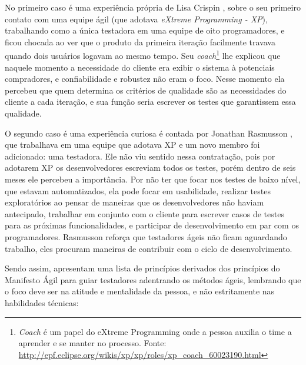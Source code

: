 \documentclass[
	12pt,				%
	openright,			%
	oneside,			%
	a4paper,			%
	english,			%
	brazil,				%
	]{abntex2}
\begin{document}
No primeiro caso é uma experiência própria de Lisa Crispin \cite{crispin2009}, sobre o seu primeiro contato com uma equipe ágil (que adotava \emph{eXtreme Programming - XP}), trabalhando como a única testadora em uma equipe de oito programadores, e ficou chocada ao ver que o produto da primeira iteração facilmente travava quando dois usuários logavam ao mesmo tempo. Seu \emph{coach}\footnote{\emph{Coach} é um papel do eXtreme Programming onde a pessoa auxilia o time a aprender e se manter no processo. Fonte: \url{ http://epf.eclipse.org/wikis/xp/xp/roles/xp_coach_60023190.html}} lhe explicou que naquele momento a necessidade do cliente era exibir o sistema à potenciais compradores, e confiabilidade e robustez não eram o foco. Nesse momento ela percebeu que quem determina os critérios de qualidade são as necessidades do cliente a cada iteração, e sua função seria escrever os testes que garantissem essa qualidade.

O segundo caso é uma experiência curiosa é contada por Jonathan Rasmusson \cite{crispin2009}, que trabalhava em uma equipe que adotava XP e um novo membro foi adicionado: uma testadora. Ele não viu sentido nessa contratação, pois por adotarem XP os desenvolvedores escreviam todos os testes, porém dentro de seis meses ele percebeu a importância. Por não ter que focar nos testes de baixo nível, que estavam automatizados, ela pode focar em usabilidade, realizar testes exploratórios ao pensar de maneiras que os desenvolvedores não haviam antecipado, trabalhar em conjunto com o cliente para escrever casos de testes para as próximas funcionalidades, e participar de desenvolvimento em par com os programadores. Rasmusson reforça que testadores ágeis não ficam aguardando trabalho, eles procuram maneiras de contribuir com o ciclo de desenvolvimento.



Sendo assim,  apresentam uma lista de princípios derivados dos princípios do Manifesto Ágil para guiar testadores adentrando os métodos ágeis, lembrando que o foco deve ser na atitude e mentalidade da pessoa, e não estritamente nas habilidades técnicas:
\end{document}
